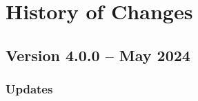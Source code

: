 \chapter{History of Changes}
\label{history}

\renewcommand{\thesection}{}
\renewcommand{\thesubsection}{\arabic{section}.\arabic{subsection}}
\makeatletter
\def\@seccntformat#1{\csname #1ignore\expandafter\endcsname\csname the#1\endcsname\quad}
\let\sectionignore\@gobbletwo
\let\latex@numberline\numberline
\def\numberline#1{\if\relax#1\relax\else\latex@numberline{#1}\fi}
\makeatother


\section{Version 4.0.0 -- May 2024}

\subsection*{ Updates}

